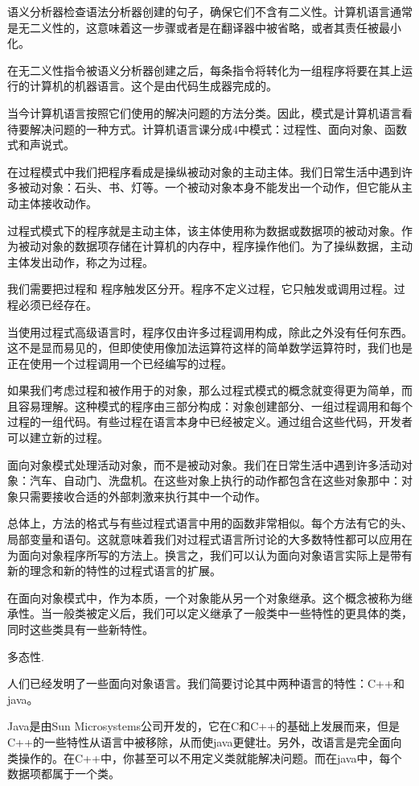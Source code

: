 语义分析器检查语法分析器创建的句子，确保它们不含有二义性。计算机语言通常是无二义性的，这意味着这一步骤或者是在翻译器中被省略，或者其责任被最小化。

在无二义性指令被语义分析器创建之后，每条指令将转化为一组程序将要在其上运行的计算机的机器语言。这个是由代码生成器完成的。

当今计算机语言按照它们使用的解决问题的方法分类。因此，模式是计算机语言看待要解决问题的一种方式。计算机语言课分成4中模式：过程性、面向对象、函数式和声说式。

在过程模式中我们把程序看成是操纵被动对象的主动主体。我们日常生活中遇到许多被动对象：石头、书、灯等。一个被动对象本身不能发出一个动作，但它能从主动主体接收动作。

过程式模式下的程序就是主动主体，该主体使用称为数据或数据项的被动对象。作为被动对象的数据项存储在计算机的内存中，程序操作他们。为了操纵数据，主动主体发出动作，称之为过程。

我们需要把过程和 程序触发区分开。程序不定义过程，它只触发或调用过程。过程必须已经存在。

当使用过程式高级语言时，程序仅由许多过程调用构成，除此之外没有任何东西。这不是显而易见的，但即使使用像加法运算符这样的简单数学运算符时，我们也是正在使用一个过程调用一个已经编写的过程。

如果我们考虑过程和被作用于的对象，那么过程式模式的概念就变得更为简单，而且容易理解。这种模式的程序由三部分构成：对象创建部分、一组过程调用和每个过程的一组代码。有些过程在语言本身中已经被定义。通过组合这些代码，开发者可以建立新的过程。

面向对象模式处理活动对象，而不是被动对象。我们在日常生活中遇到许多活动对象：汽车、自动门、洗盘机。在这些对象上执行的动作都包含在这些对象那中：对象只需要接收合适的外部刺激来执行其中一个动作。

总体上，方法的格式与有些过程式语言中用的函数非常相似。每个方法有它的头、局部变量和语句。这就意味着我们对过程式语言所讨论的大多数特性都可以应用在为面向对象程序所写的方法上。换言之，我们可以认为面向对象语言实际上是带有新的理念和新的特性的过程式语言的扩展。

在面向对象模式中，作为本质，一个对象能从另一个对象继承。这个概念被称为继承性。当一般类被定义后，我们可以定义继承了一般类中一些特性的更具体的类，同时这些类具有一些新特性。

多态性.

人们已经发明了一些面向对象语言。我们简要讨论其中两种语言的特性：C++和java。

Java是由Sun Microsystems公司开发的，它在C和C++的基础上发展而来，但是C++的一些特性从语言中被移除，从而使java更健壮。另外，改语言是完全面向类操作的。在C++中，你甚至可以不用定义类就能解决问题。而在java中，每个数据项都属于一个类。

